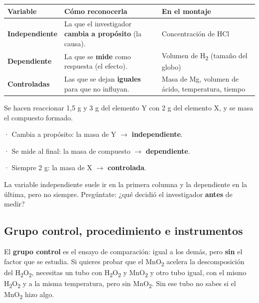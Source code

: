  
\begin{center}\small
\begin{tabularx}{\linewidth}{@{}>{\raggedright\arraybackslash\hsize=0.50\hsize}X>{\raggedright\arraybackslash\hsize=1.25\hsize}X>{\raggedright\arraybackslash\hsize=1.25\hsize}X@{}}
\toprule
\textbf{Variable} & \textbf{Cómo reconocerla} & \textbf{En el montaje} \\
\midrule
\textbf{Independiente} & La que el investigador \textbf{cambia a propósito} (la causa). & Concentración de HCl \\
\textbf{Dependiente} & La que se \textbf{mide} como respuesta (el efecto). & Volumen de H\textsubscript{2} (tamaño del globo) \\
\textbf{Controladas} & Las que se dejan \textbf{iguales} para que no influyan. & Masa de Mg, volumen de ácido, temperatura, tiempo \\
\bottomrule
\end{tabularx}
\end{center}
  
 
\begin{ejemplo} Se hacen reaccionar 1,5 g y 3 g del elemento Y con 2 g del elemento X, y se masa el compuesto formado.\par · Cambia a propósito: la masa de Y \ensuremath{\rightarrow} \textbf{independiente}.\par · Se mide al final: la masa de compuesto \ensuremath{\rightarrow} \textbf{dependiente}.\par · Siempre 2 g: la masa de X \ensuremath{\rightarrow} \textbf{controlada}.\end{ejemplo}
 
\begin{ojo} La variable independiente suele ir en la primera columna y la dependiente en la última, pero no siempre. Pregúntate: ¿qué decidió el investigador \textbf{antes} de medir?\end{ojo}
\subsection{Grupo control, procedimiento e instrumentos}
El \textbf{grupo control} es el ensayo de comparación: igual a los demás, pero \textbf{sin} el factor que se estudia. Si quieres probar que el MnO\textsubscript{2} acelera la descomposición del H\textsubscript{2}O\textsubscript{2}, necesitas un tubo con H\textsubscript{2}O\textsubscript{2} y MnO\textsubscript{2} y otro tubo igual, con el mismo H\textsubscript{2}O\textsubscript{2} y a la misma temperatura, pero sin MnO\textsubscript{2}. Sin ese tubo no sabes si el MnO\textsubscript{2} hizo algo.

